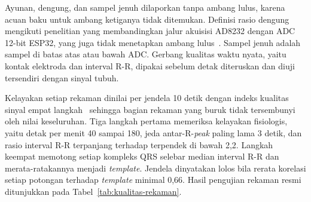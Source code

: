 Ayunan, dengung, dan sampel jenuh dilaporkan tanpa ambang lulus, karena acuan baku untuk ambang ketiganya tidak ditemukan. Definisi rasio dengung mengikuti penelitian yang membandingkan jalur akuisisi AD8232 dengan ADC 12-bit ESP32, yang juga tidak menetapkan ambang lulus~\cite{gajdzik_2026}. Sampel jenuh adalah sampel di batas atas atau bawah ADC. Gerbang kualitas waktu nyata, yaitu kontak elektroda dan interval R-R, dipakai sebelum detak diteruskan dan diuji tersendiri dengan sinyal tubuh.

Kelayakan setiap rekaman dinilai per jendela 10 detik dengan indeks kualitas sinyal empat langkah~\cite{syversen_2024} sehingga bagian rekaman yang buruk tidak tersembunyi oleh nilai keseluruhan. Tiga langkah pertama memeriksa kelayakan fisiologis, yaitu detak per menit 40 sampai 180, jeda antar-R-\textit{peak} paling lama 3 detik, dan rasio interval R-R terpanjang terhadap terpendek di bawah 2,2. Langkah keempat memotong setiap kompleks QRS selebar median interval R-R dan merata-ratakannya menjadi \textit{template}. Jendela dinyatakan lolos bila rerata korelasi setiap potongan terhadap \textit{template} minimal 0,66. Hasil pengujian rekaman resmi ditunjukkan pada Tabel~\ref{tab:kualitas-rekaman}.

